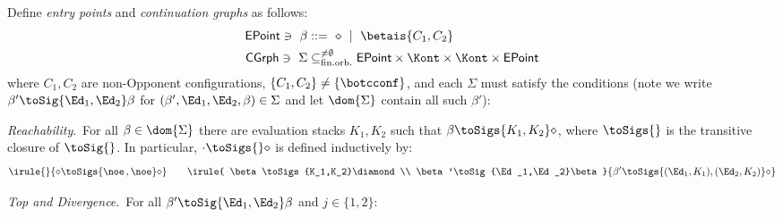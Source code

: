 \begin{definition}\label{def:betaSigma}
  Define \emph{entry points} and \emph{continuation graphs} as follows:
  \begin{align*}
    \mathsf{EPoint} \ni \ \beta &::=\ \diamond\ \mid\ \betais{C_1,C_2}\\
    \mathsf{CGrph}\ni \ \Sigma &\subseteq_{\rm fin.orb.}^{\neq\emptyset} \mathsf{EPoint}\times\Kont\times\Kont\times\mathsf{EPoint}
  \end{align*}
  where $C_1,C_2$ are non-Opponent
  configurations, $\{C_1,C_2\}\neq\{\botcconf\}$, and each $\Sigma$ must satisfy the conditions (note we write $\beta'\toSig{\Ed_1,\Ed_2}\beta$ for $(\beta',\Ed_1,\Ed_2,\beta)\in\Sigma$ and let $\dom{\Sigma}$ contain all such $\beta'$):
  \begin{compactitem}
\item{} \emph{Reachability}.~For all $\beta\in\dom{\Sigma}$ there are evaluation stacks $K_1,K_2$ such that $\beta\toSigs{K_1,K_2}\diamond$, where $\toSigs{}$ is the transitive closure of $\toSig{}$. In particular, $\cdot\toSigs{}\diamond$ is defined inductively by:\vspace{-2mm}
  \[
    \irule{
    }{
      \diamond\toSigs{\noe\,,\noe}\diamond
    }
    \qquad
    \irule{
      \beta\toSigs{K_1,K_2}\diamond
      \\
      \beta'\toSig{\Ed_1,\Ed_2}\beta
    }{
      \beta'\toSigs{(\Ed_1,K_1),(\Ed_2,K_2)}\diamond
    }
\vspace{-2mm}  \]
\item \emph{Top and Divergence}.~For all $\beta'\toSig{\Ed_1,\Ed_2}\beta$ and $j\in\{1,2\}$:
  \begin{align*}

\end{align*}
\end{compactitem}
\end{definition}
